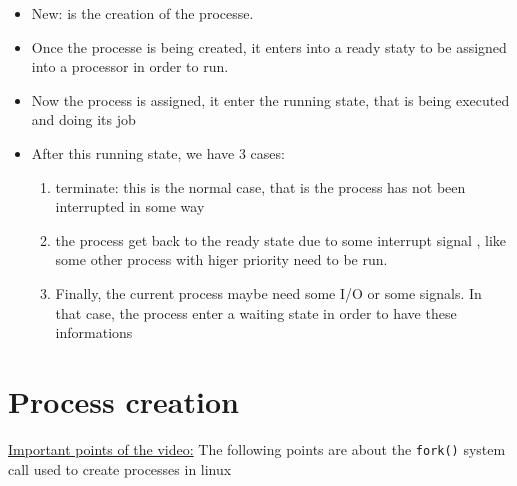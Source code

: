 \documentclass[12pt,a4paper]{book}
\begin{document}
\begin{itemize}

\item New: is the creation of the processe.

\item Once the processe is being created, it enters into a ready staty to be assigned into a processor in order to run.

\item Now the process is assigned, it enter the running state, that is being executed and doing its job

\item After this running state, we have 3 cases:

	\begin{enumerate}
	
	\item terminate: this is the normal case, that is the process has not been interrupted in some way	
	
	\item the process get back to the ready state due to some interrupt signal , like some other process with higer priority need to be run.
	
	\item Finally, the current process maybe need some I/O or some signals. In that case, the process enter a waiting state in order to have these informations	
	
	\end{enumerate}



\end{itemize}



\newpage
\section{Process creation}

\underline{Important points of the video:} The following points are about the \verb|fork()| system call used to create processes in linux
\end{document}
